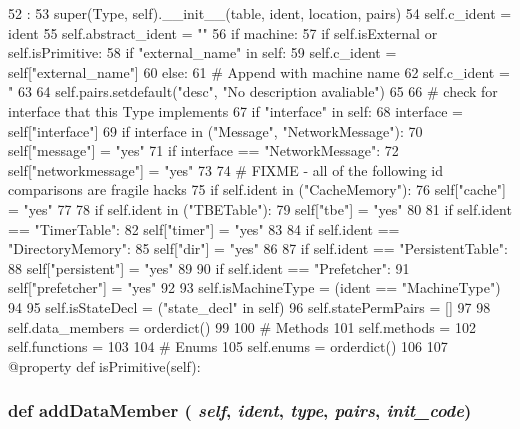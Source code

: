 \begin{DoxyCode}
52                                                                    :
53         super(Type, self).__init__(table, ident, location, pairs)
54         self.c_ident = ident
55         self.abstract_ident = ""
56         if machine:
57             if self.isExternal or self.isPrimitive:
58                 if "external_name" in self:
59                     self.c_ident = self["external_name"]
60             else:
61                 # Append with machine name
62                 self.c_ident = "%
63 
64         self.pairs.setdefault("desc", "No description avaliable")
65 
66         # check for interface that this Type implements
67         if "interface" in self:
68             interface = self["interface"]
69             if interface in ("Message", "NetworkMessage"):
70                 self["message"] = "yes"
71             if interface == "NetworkMessage":
72                 self["networkmessage"] = "yes"
73 
74         # FIXME - all of the following id comparisons are fragile hacks
75         if self.ident in ("CacheMemory"):
76             self["cache"] = "yes"
77 
78         if self.ident in ("TBETable"):
79             self["tbe"] = "yes"
80 
81         if self.ident == "TimerTable":
82             self["timer"] = "yes"
83 
84         if self.ident == "DirectoryMemory":
85             self["dir"] = "yes"
86 
87         if self.ident == "PersistentTable":
88             self["persistent"] = "yes"
89 
90         if self.ident == "Prefetcher":
91             self["prefetcher"] = "yes"
92 
93         self.isMachineType = (ident == "MachineType")
94 
95         self.isStateDecl = ("state_decl" in self)
96         self.statePermPairs = []
97 
98         self.data_members = orderdict()
99 
100         # Methods
101         self.methods = {}
102         self.functions = {}
103 
104         # Enums
105         self.enums = orderdict()
106 
107     @property
    def isPrimitive(self):
\end{DoxyCode}
\hypertarget{classslicc_1_1symbols_1_1Type_1_1Type_a5fd45667498cb27660b6d124a7a6d297}{
\subsubsection[{addDataMember}]{\setlength{\rightskip}{0pt plus 5cm}def addDataMember ( {\em self}, \/   {\em ident}, \/   {\em type}, \/   {\em pairs}, \/   {\em init\_\-code})}}
\label{classslicc_1_1symbols_1_1Type_1_1Type_a5fd45667498cb27660b6d124a7a6d297}



